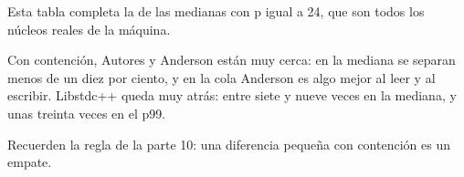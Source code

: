 Esta tabla completa la de las medianas con p igual a 24, que son todos los núcleos reales de la máquina.

Con contención, Autores y Anderson están muy cerca: en la mediana se separan menos de un diez por ciento, y en la cola Anderson es algo mejor al leer y al escribir. Libstdc++ queda muy atrás: entre siete y nueve veces en la mediana, y unas treinta veces en el p99.

Recuerden la regla de la parte 10: una diferencia pequeña con contención es un empate.
